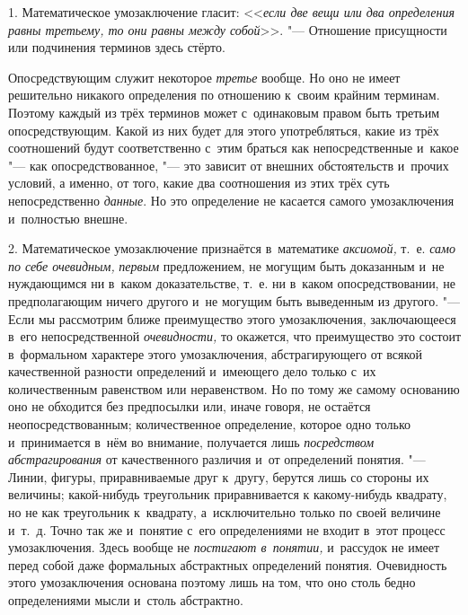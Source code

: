 \label{bkm:bm110a}

1. Математическое умозаключение гласит:
<<{\em если две вещи или два определения
равны третьему, то они равны между собой}>>. "--- Отношение
присущности или подчинения терминов здесь стёрто.

Опосредствующим служит некоторое
{\em третье} вообще. Но
оно не имеет решительно никакого определения по отношению к~своим крайним
терминам. Поэтому каждый из трёх терминов может с~одинаковым правом быть
третьим опосредствующим. Какой из них будет для этого употребляться, какие
из трёх соотношений будут соответственно с~этим браться как
непосредственные и~какое "--- как опосредствованное, "---
это зависит от внешних обстоятельств и~прочих условий, а
именно, от того, какие два соотношения из этих трёх суть непосредственно
{\em данные}. Но это
определение не касается самого умозаключения и~полностью внешне.

2. Математическое умозаключение признаётся в~математике
{\em аксиомой,} т.~е.
{\em само по себе очевидным,}
{\em первым} предложением,
не могущим быть доказанным и~не нуждающимся ни в~каком доказательстве,
т.~е. ни в~каком опосредствовании, не предполагающим ничего другого и~не
могущим быть выведенным из другого. "--- Если мы рассмотрим
ближе преимущество этого умозаключения, заключающееся в~его
непосредственной {\em очевидности,}
то окажется, что преимущество это состоит в~формальном
характере этого умозаключения, абстрагирующего от всякой качественной
разности определений и~имеющего дело только с~их количественным равенством
или неравенством. Но по тому же самому основанию оно не обходится без
предпосылки или, иначе говоря, не остаётся неопосредствованным;
количественное определение, которое одно только и~принимается в~нём во
внимание, получается лишь
{\em посредством абстрагирования}
от качественного различия и~от определений понятия. "---
Линии, фигуры, приравниваемые друг к~другу, берутся лишь со
стороны их величины; какой-нибудь треугольник приравнивается к
какому-нибудь квадрату, но не как треугольник к~квадрату, а~исключительно
только по своей величине и~т.~д. Точно так же и~понятие с~его определениями
не входит в~этот процесс умозаключения. Здесь вообще не
{\em постигают в~понятии,}
и~рассудок не имеет перед собой даже формальных абстрактных
определений понятия. Очевидность этого умозаключения основана поэтому лишь
на том, что оно столь бедно определениями мысли и~столь абстрактно.

